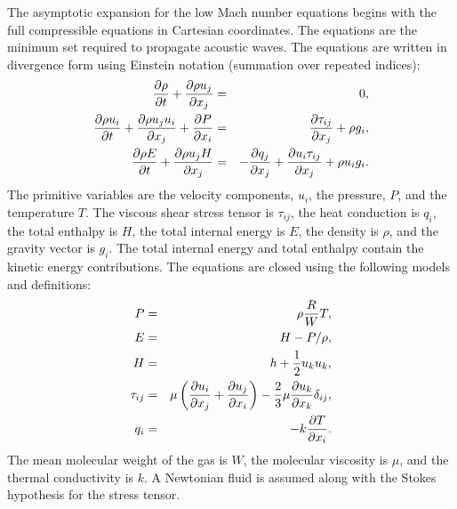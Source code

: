 The asymptotic expansion for the low Mach number equations
begins with
the full compressible equations in Cartesian coordinates.  
The equations are the minimum set required to propagate
acoustic waves.  The equations
are written in divergence form using Einstein notation
(summation over repeated indices):
%
\begin{eqnarray}
{{\partial \rho} \over {\partial t}} + {{\partial \rho u_j} 
                               \over {\partial x_j}} & =  & 0 , \\
{{\partial \rho u_i} \over {\partial t}} + {{\partial \rho u_j u_i}
    \over {\partial x_j}} + {{\partial P} \over {\partial x_i}} & = &
    {{\partial \tau_{ij}} \over {\partial x_j}} + \rho g_i , \\
{{\partial \rho E} \over {\partial t}} + {{\partial \rho u_j H}
    \over {\partial x_j}}  & = &
    - {{\partial q_j} \over {\partial x_j}}
    + {{\partial u_i \tau_{ij}} \over {\partial x_j}} + \rho u_i g_i .
\end{eqnarray}
%
The primitive variables are the velocity components, $u_i$, the pressure,
$P$, and the temperature $T$.  The viscous shear stress tensor is
$\tau_{ij}$, the heat conduction is $q_i$, the total enthalpy is
$H$, the total internal energy is $E$, the density is $\rho$, and
the gravity vector is $g_i$.  The total internal energy and total
enthalpy contain the kinetic energy contributions.
The equations are closed using the following models and definitions:
%
\begin{eqnarray}
P & = & \rho {R \over W} T , \\
E & = & H - P/\rho , \\
H & = & h + {1 \over 2} u_k u_k , \\
\tau_{ij} & = & \mu \left( {{\partial u_i} \over {\partial x_j}}
                  +        {{\partial u_j} \over {\partial x_i}} \right)
            - {2 \over 3} \mu {{\partial u_k} \over {\partial x_k}} 
               \delta_{ij} , \\
q_i & = & - k {{\partial T} \over {\partial x_i}} .
\end{eqnarray}
%
The mean molecular weight of the gas is $W$, the molecular
viscosity is $\mu$, and the thermal conductivity is $k$.
A Newtonian fluid is assumed along with the Stokes hypothesis
for the stress tensor.

